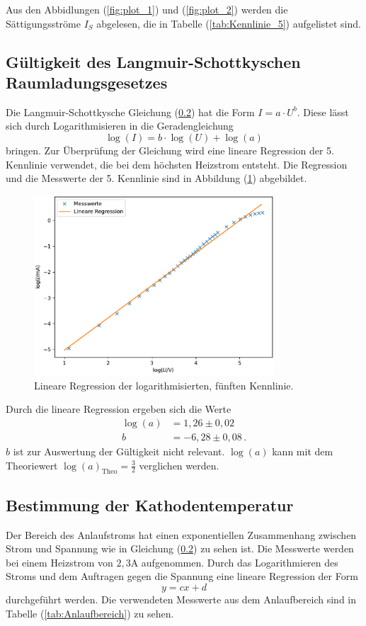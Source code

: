 Aus den Abbidlungen (\ref{fig:plot_1}) und (\ref{fig:plot_2}) werden die Sättigungsströme $I_S$ abgelesen, die in Tabelle (\ref{tab:Kennlinie_5}) aufgelistet sind.

\subsection{Gültigkeit des Langmuir-Schottkyschen Raumladungsgesetzes}
Die Langmuir-Schottkysche Gleichung (\ref{}) hat die Form $I = a \cdot U^b$. Diese lässt sich durch Logarithmisieren 
in die Geradengleichung 
    \begin{equation*}
    \log(I) = b \cdot \log(U) + \log(a)
    \end{equation*}
bringen. Zur Überprüfung der Gleichung wird eine lineare Regression der 5. Kennlinie verwendet, die bei dem 
höchsten Heizstrom entsteht. Die Regression und die Messwerte der 5. Kennlinie sind in Abbildung (\ref{fig:plot_3}) abgebildet. 
\begin{figure}
    \centering
    \includegraphics[width=0.8\textwidth]{plot_3.pdf}
    \caption{Lineare Regression der logarithmisierten, fünften Kennlinie.}
    \label{fig:plot_3}
\end{figure}

Durch die lineare Regression ergeben sich 
die Werte
\begin{align}
    \log(a) &= 1,26 \pm 0,02 \\
    b &= -6,28 \pm 0,08 \, .
\end{align}
$b$ ist zur Auswertung der Gültigkeit nicht relevant. $\log(a)$ kann mit dem Theoriewert $\log(a)_{\text{Theo}}= \frac{3}{2}$ verglichen werden.

\subsection{Bestimmung der Kathodentemperatur}
Der Bereich des Anlaufstroms hat einen exponentiellen Zusammenhang zwischen Strom und 
Spannung wie in Gleichung (\ref{}) zu sehen ist. Die Messwerte werden bei einem Heizstrom
von $2,3 \unit{\ampere}$ aufgenommen. Durch das Logarithmieren des Stroms 
und dem Auftragen gegen die Spannung eine lineare Regression der Form 
$$y = cx + d$$
durchgeführt werden. Die verwendeten Messwerte aus dem Anlaufbereich sind in Tabelle (\ref{tab:Anlaufbereich}) zu sehen. 

